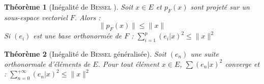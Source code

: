 \documentclass[11pt,a4paper]{report}
\newtheorem{theorem}{Théorème}[chapter]
\theoremstyle{definition}
\begin{document}
\begin{theorem}[Inégalité de \textsc{Bessel} ]
Soit $x\in E$ et $p_F(x)$ sont projeté sur un sous-espace vectoriel $F$. Alors : 
\begin{equation}
\| p_F (x) \| \le \| x \|
\end{equation}
Si $(e_i)$ est une base orthonormée de $F$ : 
$\boxed{\sum_{i=1}^{p} (e_i|x)^2 \le \| x \|^2}$
\end{theorem}
\begin{theorem}[Inégalité de \textsc{Bessel} généralisée]
Soit $(e_n)$ une suite orthonormale d'éléments de $E$. Pour tout élément $x\in E$, $\sum (e_n | x )^2$ converge et : 
$\boxed{\sum_{n=0}^{+\infty} (e_n|x)^2 \le \| x \|^2}$
\end{theorem}
\end{document}
